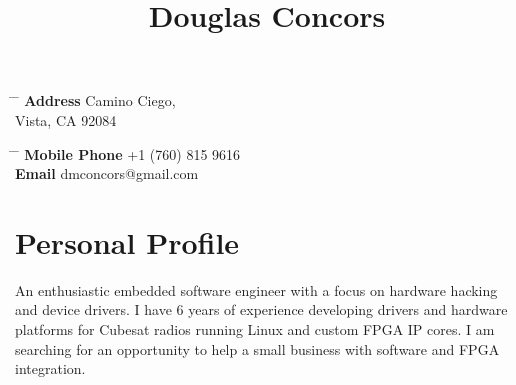 \documentclass[10pt]{article} %
\begin{document}

\begin{center}
\title{Douglas Concors} %
\end{center}


\parbox{0.5\textwidth}{ %
\begin{tabbing} %
\hspace{3cm} \= \hspace{4cm} \= \kill %
{\bf Address}  Camino Ciego,\\ %
\> Vista, CA 92084 \\ %
\end{tabbing}}
\hfill %
\parbox{0.5\textwidth}{ %
\begin{tabbing} %
\hspace{3cm} \= \hspace{4cm} \= \kill %
{\bf Mobile Phone} \> +1 (760) 815 9616 \\ %
{\bf Email} \> dmconcors@gmail.com \\ %
\end{tabbing}}


\section{Personal Profile}

An enthusiastic embedded software engineer with a focus on hardware hacking and device drivers. I have 6 years of experience developing drivers and hardware platforms for Cubesat radios running Linux and custom FPGA IP cores. I am searching for an opportunity to help a small business with software and FPGA integration.
\end{document}
